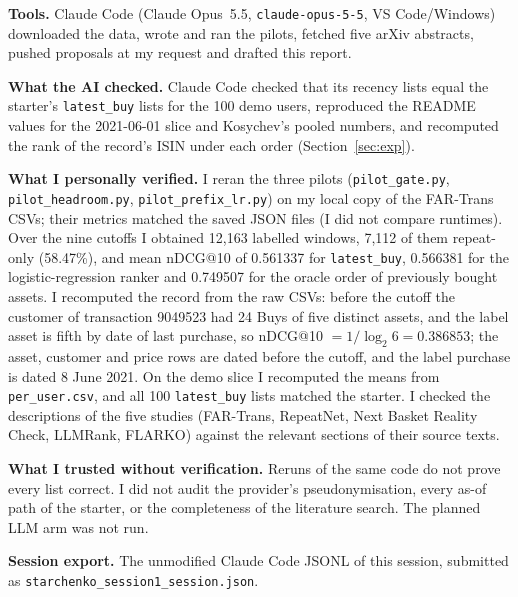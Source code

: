 \documentclass[conference]{IEEEtran}
\begin{document}
\textbf{Tools.} Claude Code (Claude Opus~5.5, \texttt{claude-opus-5-5}, VS Code/Windows) downloaded the data, wrote and ran the pilots, fetched five arXiv abstracts, pushed proposals at my request and drafted this report.

\textbf{What the AI checked.} Claude Code checked that its recency lists equal the starter's \texttt{latest\_buy} lists for the 100 demo users, reproduced the README values for the 2021-06-01 slice and Kosychev's pooled numbers, and recomputed the rank of the record's ISIN under each order (Section~\ref{sec:exp}).

\textbf{What I personally verified.} I reran the three pilots (\texttt{pilot\_gate.py}, \texttt{pilot\_headroom.py}, \texttt{pilot\_prefix\_lr.py}) on my local copy of the FAR-Trans CSVs; their metrics matched the saved JSON files (I did not compare runtimes). Over the nine cutoffs I obtained 12,163 labelled windows, 7,112 of them repeat-only (58.47\%), and mean nDCG@10 of 0.561337 for \texttt{latest\_buy}, 0.566381 for the logistic-regression ranker and 0.749507 for the oracle order of previously bought assets. I recomputed the record from the raw CSVs: before the cutoff the customer of transaction 9049523 had 24 Buys of five distinct assets, and the label asset is fifth by date of last purchase, so nDCG@10 $=1/\log_2 6=0.386853$; the asset, customer and price rows are dated before the cutoff, and the label purchase is dated 8 June 2021. On the demo slice I recomputed the means from \texttt{per\_user.csv}, and all 100 \texttt{latest\_buy} lists matched the starter. I checked the descriptions of the five studies (FAR-Trans, RepeatNet, Next Basket Reality Check, LLMRank, FLARKO) against the relevant sections of their source texts.

\textbf{What I trusted without verification.} Reruns of the same code do not prove every list correct. I did not audit the provider's pseudonymisation, every as-of path of the starter, or the completeness of the literature search. The planned LLM arm was not run.

\textbf{Session export.} The unmodified Claude Code JSONL of this session, submitted as \texttt{starchenko\_session1\_\allowbreak session.json}.
\end{document}
